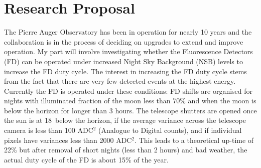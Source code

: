 \chapter{Research Proposal}


 
The Pierre Auger Observatory has been in operation for nearly 10 years and the collaboration is in the process of deciding on upgrades to extend and improve operation. My part will involve investigating whether the Fluorescence Detectors (FD) can be operated under increased Night Sky Background (NSB) levels to increase the FD duty cycle. The interest in increasing the FD duty cycle stems from the fact that there are very few detected events at the highest energy. Currently the FD is operated under these conditions: FD shifts are organised for nights with illuminated fraction of the moon less than 70\% and when the moon is below the horizon for longer than 3 hours. The telescope shutters are opened once the sun is at 18\textdegree \ below the horizon, if the average variance across the telescope camera is less than 100 ADC$^2$ (Analogue to Digital counts), and if individual pixels have variances less than 2000 ADC$^2$. This leads to a theoretical up-time of 22\% but after removal of short nights (less than 2 hours) and bad weather, the actual duty cycle of the FD is about 15\% of the year.


